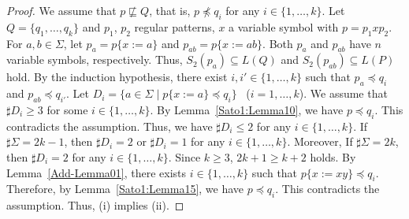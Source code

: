 \begin{proof}
    We assume that $p \not\sqsubseteq Q$, that is, $p \not\preceq q_{i}$
    for any $i \in \{1,\ldots,k\}$.
    Let $Q = \{q_{1},\ldots,q_{k}\}$ and
    $p_{1}$, $p_{2}$ regular patterns, $x$ a variable symbol with
    $p = p_{1}xp_{2}$.
    For $a, b \in \Sigma$,
    let $p_{a}=p\{x:=a\}$ and $p_{ab}=p\{x:=ab\}$.
    Both $p_{a}$ and $p_{ab}$ have $n$ variable symbols, respectively.
    Thus, $S_{2}(p_{a}) \subseteq L(Q)$ and $S_{2}(p_{ab}) \subseteq L(P)$ hold.
    By the induction hypothesis,
    there exist $i, i' \in \{1,\ldots,k\}$ such that
    $p_{a} \preceq q_{i}$ and $p_{ab} \preceq q_{i'}$.
    Let $D_{i} = \{a \in \Sigma \mid p\{x:=a\} \preceq q_{i}\}$ \ ($i=1,\ldots,k$).
    We assume that $\sharp D_{i} \geq 3$ for some $i \in \{1,\ldots, k\}$.
    By Lemma~\ref{Sato1:Lemma10}, %
    we have $p \preceq q_{i}$.
    This contradicts the assumption.
    Thus, we have $\sharp D_{i} \leq 2$ for any $i \in \{1,\ldots,k\}$.
    If $\sharp\Sigma = 2k-1$, then
    $\sharp D_{i}=2$ or $\sharp D_{i}=1$ for any $i \in \{1,\ldots,k\}$.
    Moreover,
    If $\sharp\Sigma = 2k$, then
    $\sharp D_{i}=2$ for any $i \in \{1,\ldots,k\}$.
    Since $k \geq 3$, $2k+1 \geq k+2$ holds.
    By Lemma~\ref{Add-Lemma01},%
    there exists $i \in \{1,\ldots,k\}$ such that $p\{x:=xy\} \preceq q_{i}$.
    Therefore, by Lemma~\ref{Sato1:Lemma15}, %
    we have $p \preceq q_{i}$.
    This contradicts the assumption.
    Thus, (i) implies (ii).
\end{proof}


